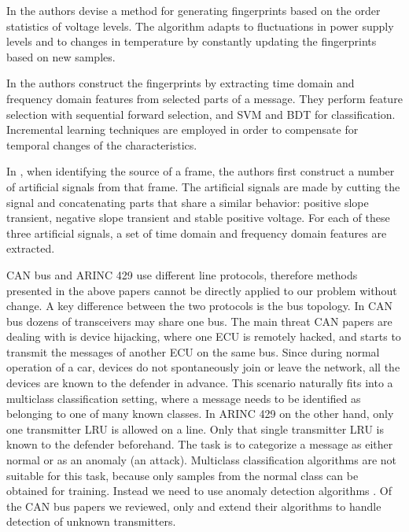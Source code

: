 \documentclass[compsoc,conference,a4paper,10pt,times]{IEEEtran}
\begin{document}
  In \cite{cho2017viden} the authors devise a method for generating fingerprints based on the order statistics of voltage levels. The algorithm adapts to fluctuations in power supply levels and to changes in temperature by constantly updating the fingerprints based on new samples.
  
  In \cite{choi2018voltageids} the authors construct the fingerprints by extracting time domain and frequency domain features from selected parts of a message. They perform feature selection with sequential forward selection, and SVM and BDT for classification. Incremental learning techniques \cite{diehl2003svm} are employed in order to compensate for temporal changes of the characteristics.
  
  In \cite{kneib2018scission}, when identifying the source of a frame, the authors first construct a number of artificial signals from that frame. The artificial signals are made by cutting the signal and concatenating parts that share a similar behavior: positive slope transient, negative slope transient and stable positive voltage. For each of these three artificial signals, a set of time domain and frequency domain features are extracted.
  
  CAN bus and ARINC 429 use different line protocols, therefore methods presented in the above papers cannot be directly applied to our problem without change. A key difference between the two protocols is the bus topology. In CAN bus dozens of transceivers may share one bus. The main threat CAN papers are dealing with is device hijacking, where one ECU is remotely hacked, and starts to transmit the messages of another ECU on the same bus. Since during normal operation of a car, devices do not spontaneously join or leave the network, all the devices are known to the defender in advance. This scenario naturally fits into a multiclass classification setting, where a message needs to be identified as belonging to one of many known classes. In ARINC 429 on the other hand, only one transmitter LRU is allowed on a line. Only that single transmitter LRU is known to the defender beforehand. The task is to categorize a message as either normal or as an anomaly (an attack). Multiclass classification algorithms are not suitable for this task, because only samples from the normal class can be obtained for training. Instead we need to use anomaly detection algorithms \cite{pimentel2014review}. Of the CAN bus papers we reviewed, only \cite{choi2018identifying} and \cite{choi2018voltageids} extend their algorithms to handle detection of unknown transmitters.
  
\end{document}
